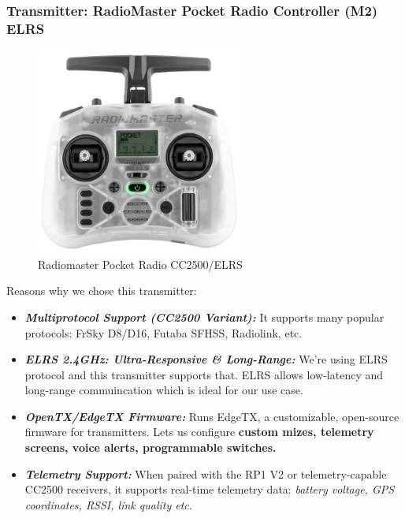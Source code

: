 \documentclass[12pt]{report}
\begin{document}
        \subsubsection{\large Transmitter: {RadioMaster Pocket Radio Controller (M2) ELRS}}
        \begin{figure}
          \includegraphics[width=1\linewidth]{transmitter.png}
          \caption{Radiomaster Pocket Radio CC2500/ELRS}
          \label{fig:transmitter}
        \end{figure}
        Reasons why we chose this transmitter:
        \begin{itemize}
          \item \textbf{\textit{Multiprotocol Support (CC2500 Variant):}} It supports many popular protocols: FrSky D8/D16, Futaba SFHSS, Radiolink, etc.
          \item \textbf{\textit{ELRS 2.4GHz: Ultra-Responsive \& Long-Range:}} We're using ELRS protocol and this transmitter supports that. ELRS allows low-latency and long-range commuincation which is ideal for our use case.
          \item \textbf{\textit{OpenTX/EdgeTX Firmware:}} Runs EdgeTX, a customizable, open-source firmware for transmitters. Lets us configure \textbf{custom mizes, telemetry screens, voice alerts, programmable switches.}
          \item \textbf{\textit{Telemetry Support:}} When paired with the RP1 V2 or telemetry-capable CC2500 receivers, it supports real-time telemetry data: \textit{battery voltage, GPS coordinates, RSSI, link quality etc.}
        \end{itemize}
        \vspace{0.5cm}
\end{document}
